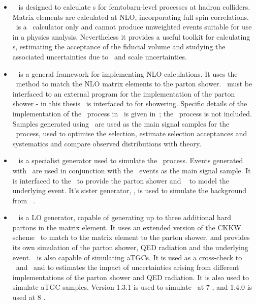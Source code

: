 \begin{itemize}
    \item \mcfm ~\cite{Campbell:2011} is designed to calculate \cx s for
    femtobarn-level processes at hadron colliders. Matrix elements are
    calculated at NLO, incorporating full spin correlations. \mcfm\ is a \cx\
    calculator only and cannot produce unweighted events suitable for use in a
    physics analysis. Nevertheless it provides a useful toolkit for calculating
    \cx s, estimating the acceptance of the fiducial volume and studying the
    associated uncertainties due to \partDF\ and scale uncertainties.

    \item \powhegbox~\cite{Alioli:2010xd} is a general framework for implementing
    NLO calculations. It uses the \powheg\ method to match the NLO matrix
    elements to the parton shower. \powhegbox\ must be interfaced to an external
    program for the implementation of the parton shower - in this thesis
    \powhegbox\ is interfaced to \pythia for showering. Specific details of the
    implementation of the \ZZ\ process in \powhegbox\ is given
    in~\cite{Melia:2011tj}; the \ggZZ\ process is not included. 
    Samples generated using \powhegbox\ are used as the main signal samples for
    the \qqZZ\ process, used to optimise the selection, estimate selection
    acceptances and systematics and compare observed distributions with theory.

    \item \ggtwoZZ~\cite{gg2ZZ} is a specialist generator used to simulate the
    \ggZZ\ process. Events generated with \ggtwoZZ\ are used in conjunction with
    the \powhegbox\ events as the main signal sample. It is interfaced to the
    \herwig\ to provide the parton shower and \jimmy~\cite{bib:jimmy} to model the underlying
    event. It's sister generator, \ggtwoWW, is used to simulate the background
    from \ggZZ~\cite{Binoth:2006mf}.

    \item \sherpa~\cite{Gleisberg:2008ta} is a LO generator, capable of
    generating up to three additional hard partons in the matrix element. It
    uses an extended version of the CKKW scheme~\cite{Hoeche:2009rj} to match to the matrix element to the parton shower,
    and provides its own simulation of the parton shower, QED radiation and
    the underlying event. \sherpa\ is also capable of simulating aTGCs. It is
    used as a cross-check to \powhegbox\ and \ggZZ\ and to estimates the impact
    of uncertainties
    arising from different implementations of the parton shower and QED
    radiation. It is also used to simulate aTGC samples.
    Version 1.3.1 is used to simulate \qqZZllll\ at 7 \tev, and 1.4.0 is used at
    8 \tev.


\end{itemize}
